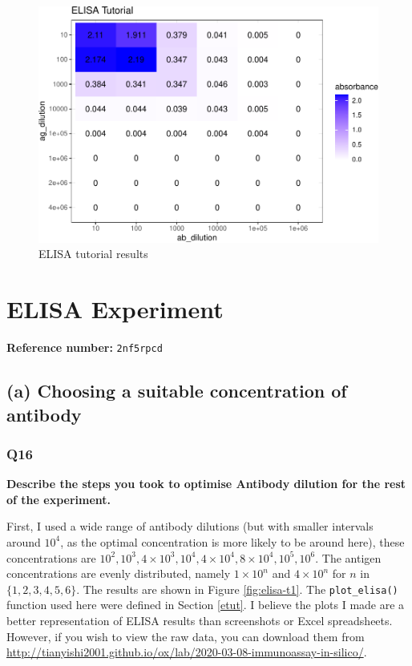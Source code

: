 \documentclass[
]{article}
\begin{document}
\begin{figure}
\includegraphics[width=1\linewidth]{2020-03-08-immunoassay-in-silico_files/figure-latex/elisa-tut-1} \caption{ELISA tutorial results}\label{fig:elisa-tut}
\end{figure}

\hypertarget{elisa-experiment}{%
\section{ELISA Experiment}\label{elisa-experiment}}

\textbf{Reference number:} \texttt{2nf5rpcd}

\hypertarget{a-choosing-a-suitable-concentration-of-antibody}{%
\subsection*{(a) Choosing a suitable concentration of antibody}\label{a-choosing-a-suitable-concentration-of-antibody}}

\hypertarget{q16}{%
\subsubsection*{Q16}\label{q16}}

\textbf{Describe the steps you took to optimise Antibody dilution for the rest of the experiment.}

First, I used a wide range of antibody dilutions (but with smaller intervals around \(10^4\), as the optimal concentration is more likely to be around here), these concentrations are \(10^2, 10^3, 4\times10^3, 10^4, 4\times10^4, 8\times10^4, 10^5, 10^6\). The antigen concentrations are evenly distributed, namely \(1\times10^n\) and \(4\times10^n\) for \(n\) in \(\{1,2,3,4,5,6\}\). The results are shown in Figure \ref{fig:elisa-t1}. The \texttt{plot\_elisa()} function used here were defined in Section \ref{etut}. I believe the plots I made are a better representation of ELISA results than screenshots or Excel spreadsheets. However, if you wish to view the raw data, you can download them from \url{http://tianyishi2001.github.io/ox/lab/2020-03-08-immunoassay-in-silico/}.
\end{document}

